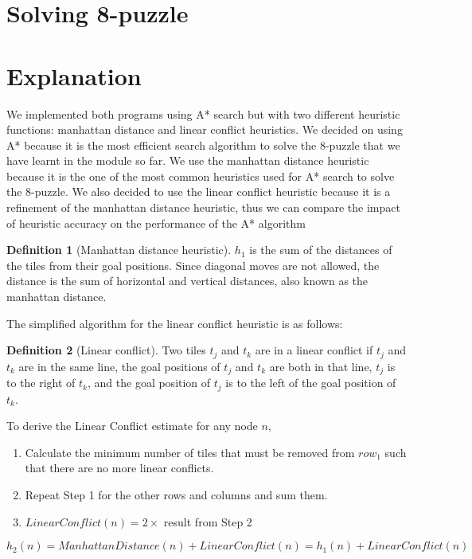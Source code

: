 \documentclass[11pt, a4paper]{article}
\theoremstyle{definition}
\newtheorem{definition}{Definition}
\begin{document}
\section*{Solving 8-puzzle}
\section{Explanation}
We implemented both programs using A* search but with two different heuristic functions: manhattan distance and linear conflict heuristics.
We decided on using A* because it is the most efficient search algorithm to solve the 8-puzzle that we have learnt in the module so far.
We use the manhattan distance heuristic because it is the one of the most common heuristics used for A* search to solve the 8-puzzle.
We also decided to use the linear conflict heuristic because it is a refinement of the manhattan distance heuristic, thus we can compare the impact of heuristic accuracy on the performance of the A* algorithm

\begin{definition}[Manhattan distance heuristic]
  $h_1$ is the sum of the distances of the tiles from their goal positions. Since diagonal moves are not allowed, the distance is the sum of horizontal and vertical distances, also known as the manhattan distance.
\end{definition}

The simplified algorithm for the linear conflict heuristic is as follows:

\begin{definition}[Linear conflict]
  Two tiles $t_j$ and $t_k$ are in a linear conflict if $t_j$ and $t_k$ are in the same line, the goal positions of $t_j$ and $t_k$ are both in that line, $t_j$ is to the right of $t_k$, and the goal position of $t_j$ is to the left of the goal position of $t_k$.
\end{definition}

To derive the Linear Conflict estimate for any node $n$,
\begin{enumerate}
  \item Calculate the minimum number of tiles that must be removed from $row_1$ such that there are no more linear conflicts.
  \item Repeat Step 1 for the other rows and columns and sum them.
  \item $LinearConflict(n) = 2 \times $ result from Step 2
\end{enumerate}
\begin{equation*}
  h_2(n) = ManhattanDistance(n) + LinearConflict(n) = h_1(n) + LinearConflict(n)
\end{equation*}
\end{document}
